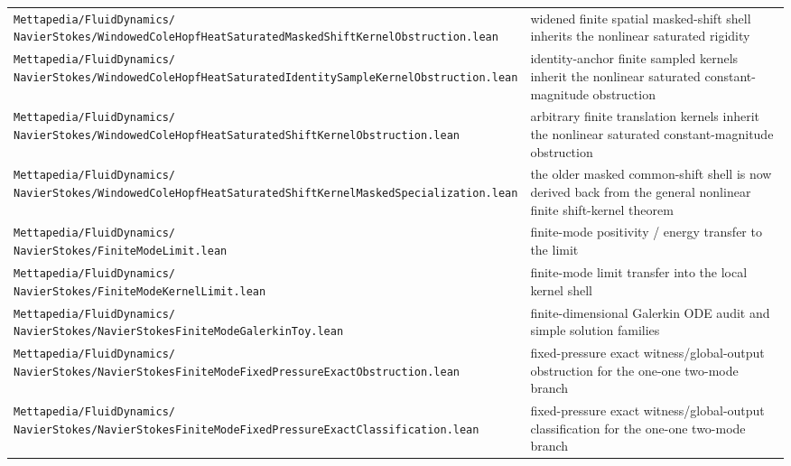 \documentclass[11pt]{article}
\theoremstyle{remark}
\begin{document}
\begin{center}
\begin{tabular}{p{}p{}}
\shortstack[l]{\texttt{Mettapedia/FluidDynamics/}\\\texttt{NavierStokes/WindowedColeHopfHeatSaturatedMaskedShiftKernelObstruction.lean}} & widened finite spatial masked-shift shell inherits the nonlinear saturated rigidity \\
\shortstack[l]{\texttt{Mettapedia/FluidDynamics/}\\\texttt{NavierStokes/WindowedColeHopfHeatSaturatedIdentitySampleKernelObstruction.lean}} & identity-anchor finite sampled kernels inherit the nonlinear saturated constant-magnitude obstruction \\
\shortstack[l]{\texttt{Mettapedia/FluidDynamics/}\\\texttt{NavierStokes/WindowedColeHopfHeatSaturatedShiftKernelObstruction.lean}} & arbitrary finite translation kernels inherit the nonlinear saturated constant-magnitude obstruction \\
\shortstack[l]{\texttt{Mettapedia/FluidDynamics/}\\\texttt{NavierStokes/WindowedColeHopfHeatSaturatedShiftKernelMaskedSpecialization.lean}} & the older masked common-shift shell is now derived back from the general nonlinear finite shift-kernel theorem \\
\shortstack[l]{\texttt{Mettapedia/FluidDynamics/}\\\texttt{NavierStokes/FiniteModeLimit.lean}} & finite-mode positivity / energy transfer to the limit \\
\shortstack[l]{\texttt{Mettapedia/FluidDynamics/}\\\texttt{NavierStokes/FiniteModeKernelLimit.lean}} & finite-mode limit transfer into the local kernel shell \\
\shortstack[l]{\texttt{Mettapedia/FluidDynamics/}\\\texttt{NavierStokes/NavierStokesFiniteModeGalerkinToy.lean}} & finite-dimensional Galerkin ODE audit and simple solution families \\
\shortstack[l]{\texttt{Mettapedia/FluidDynamics/}\\\texttt{NavierStokes/NavierStokesFiniteModeFixedPressureExactObstruction.lean}} & fixed-pressure exact witness/global-output obstruction for the one-one two-mode branch \\
\shortstack[l]{\texttt{Mettapedia/FluidDynamics/}\\\texttt{NavierStokes/NavierStokesFiniteModeFixedPressureExactClassification.lean}} & fixed-pressure exact witness/global-output classification for the one-one two-mode branch \\

\end{tabular}
\end{center}
\end{document}
